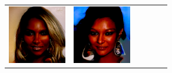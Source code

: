 \documentclass{article}
\newcommand{\pganw}{1.0in}
\begin{document}
\begin{table}[htbp]
\begin{center}
\begin{tabular}{cc|cc|cc}
\includegraphics[width=\pganw]{figures/pgan/14_base_raw_reject.png} &
\includegraphics[width=\pganw]{figures/pgan/15_base_raw_base.png} &

\end{tabular}
\end{center}
\end{table}
\end{document}
